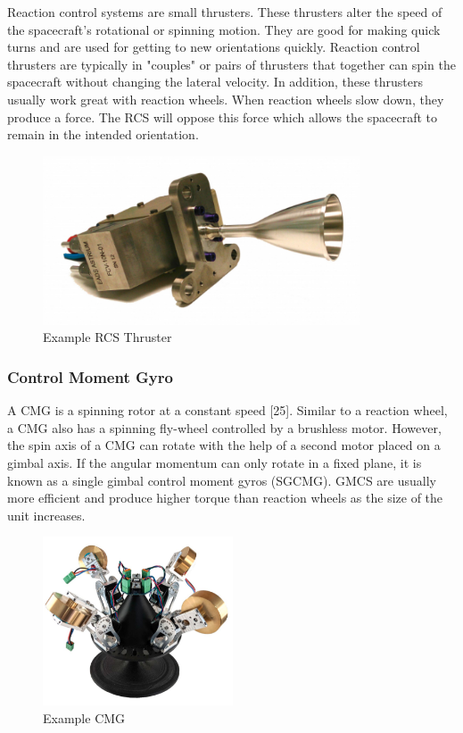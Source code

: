 \documentclass{article}
\begin{document}
Reaction control systems are small thrusters. These thrusters alter
the speed of the spacecraft's rotational or spinning motion. They are
good for making quick turns and are used for getting to new
orientations quickly. Reaction control thrusters are typically in
"couples" or pairs of thrusters that together can spin the spacecraft
without changing the lateral velocity. In addition, these thrusters
usually work great with reaction wheels. When reaction wheels slow
down, they produce a force. The RCS will oppose this force which
allows the spacecraft to remain in the intended
orientation\cite{qp23}.
\begin{figure}[H]
  \begin{center}
  \includegraphics[height=50mm]{Figures/RCS}
  \end{center}
  \caption{Example RCS Thruster \cite{qp24}}
\end{figure}

\subsubsection{Control Moment Gyro}

A CMG is a spinning rotor at a constant speed [25]. Similar to a
reaction wheel, a CMG also has a spinning fly-wheel controlled by a
brushless motor. However, the spin axis of a CMG can rotate with the
help of a second motor placed on a gimbal axis. If the angular
momentum can only rotate in a fixed plane, it is known as a single
gimbal control moment gyros (SGCMG). GMCS are usually more efficient
and produce higher torque than reaction wheels as the size of the unit
increases\cite{qp26}.
\begin{figure}[H]
  \begin{center}
  \includegraphics[height=50mm]{Figures/CMG}
  \end{center}
  \caption{Example CMG \cite{qp27}}
\end{figure}
\end{document}
